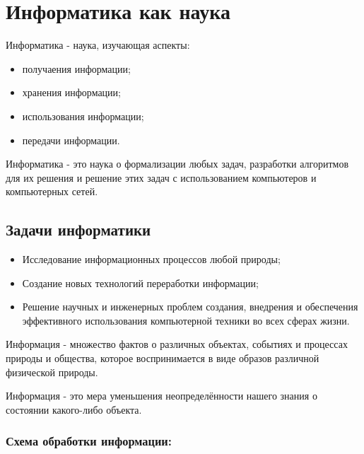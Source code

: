 
\section{Информатика как наука}

\begin{definition}
  Информатика - наука, изучающая аспекты:
  \begin{itemize}
    \item получаения информации;
    \item хранения информации;
    \item использования информации;
    \item передачи информации.
  \end{itemize}
\end{definition}

\begin{definition}
  Информатика - это наука о формализации любых задач, разработки алгоритмов для их решения и решение этих задач с использованием компьютеров и компьютерных сетей.
\end{definition}

\subsection{Задачи информатики}

\begin{itemize}
  \item Исследование информационных процессов любой природы;
  \item Создание новых технологий переработки информации;
  \item Решение научных и инженерных проблем создания, внедрения и обеспечения эффективного использования компьютерной техники во всех сферах жизни.
\end{itemize}

\begin{definition}
  Информация - множество фактов о различных объектах, событиях и процессах природы и общества, которое воспринимается в виде образов различной физической природы.
\end{definition}

\begin{definition}
  Информация - это мера уменьшения неопределённости нашего знания о состоянии какого-либо объекта.
\end{definition}


\subsubsection{Схема обработки информации:}

